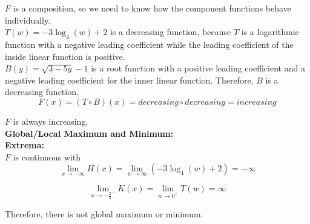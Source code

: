 \documentclass{ximera}
\begin{document}
$F$ is a composition, so we need to know how the component functions behave individually. \\





$T(w) = -3 \log_4(w) + 2$ is a decreasing function, because $T$ is a logarithmic function with a negative leading coefficient while the leading coefficient of the inside linear function is  positive. \\

$B(y) = \sqrt{3 - 5y} - 1$ is a root function with a positive leading coefficient and a negative leading coefficient for the inner linear function.  Therefore, $B$ is a decreasing function.\\





\[
F(x) = (T \circ B)(x) = decreasing \circ decreasing = increasing
\]



$F$ is always increasing. \\































\textbf{\textcolor{blue!55!black}{Global/Local Maximum and Minimum:}} \\
\textbf{Extrema:} \\

$F$ is continuous with \\




\[
\lim\limits_{x \to -\infty} H(x)  = \lim\limits_{w \to \infty} (-3 \log_4(w) + 2)  = -\infty
\]



\[
\lim\limits_{x \to -\frac{2}{5}^-} K(x)  = \lim\limits_{w \to 0^+} T(w) = \infty
\]


Therefore, there is not global maximum or minimum. \\
\end{document}
